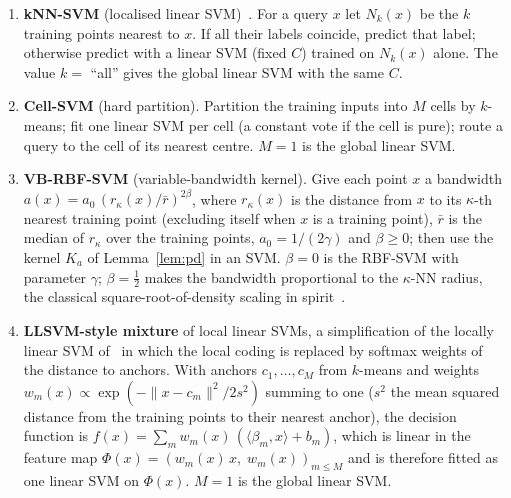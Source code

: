 \documentclass[11pt,a4paper]{article}
\theoremstyle{plain}
\theoremstyle{definition}
\theoremstyle{remark}
\begin{document}
\begin{enumerate}[leftmargin=2em,label=(\alph*),itemsep=1pt]
\item \textbf{kNN-SVM} (localised linear SVM)~\citep{bottou1992,zhang2006}. For a query $x$ let $N_k(x)$ be the $k$ training points nearest to $x$. If all their labels coincide, predict that label; otherwise predict with a linear SVM (fixed $C$) trained on $N_k(x)$ alone. The value $k=$ ``all'' gives the global linear SVM with the same $C$.
\item \textbf{Cell-SVM} (hard partition). Partition the training inputs into $M$ cells by $k$-means; fit one linear SVM per cell (a constant vote if the cell is pure); route a query to the cell of its nearest centre. $M=1$ is the global linear SVM.
\item \textbf{VB-RBF-SVM} (variable-bandwidth kernel). Give each point $x$ a bandwidth $a(x)=a_0\,(r_\kappa(x)/\bar r)^{2\beta}$, where $r_\kappa(x)$ is the distance from $x$ to its $\kappa$-th nearest training point (excluding itself when $x$ is a training point), $\bar r$ is the median of $r_\kappa$ over the training points, $a_0=1/(2\gamma)$ and $\beta\ge0$; then use the kernel $K_a$ of Lemma~\ref{lem:pd} in an SVM. $\beta=0$ is the RBF-SVM with parameter $\gamma$; $\beta=\tfrac12$ makes the bandwidth proportional to the $\kappa$-NN radius, the classical square-root-of-density scaling in spirit~\citep{abramson1982}.
\item \textbf{LLSVM-style mixture} of local linear SVMs, a simplification of the locally linear SVM of~\citet{ladicky2011} in which the local coding is replaced by softmax weights of the distance to anchors. With anchors $c_1,\dots,c_M$ from $k$-means and weights $w_m(x)\propto\exp(-\|x-c_m\|^2/2s^2)$ summing to one ($s^2$ the mean squared distance from the training points to their nearest anchor), the decision function is $f(x)=\sum_m w_m(x)\,(\langle\beta_m,x\rangle+b_m)$, which is linear in the feature map $\Phi(x)=(w_m(x)\,x,\;w_m(x))_{m\le M}$ and is therefore fitted as one linear SVM on $\Phi(x)$. $M=1$ is the global linear SVM.
\end{enumerate}
\end{document}
